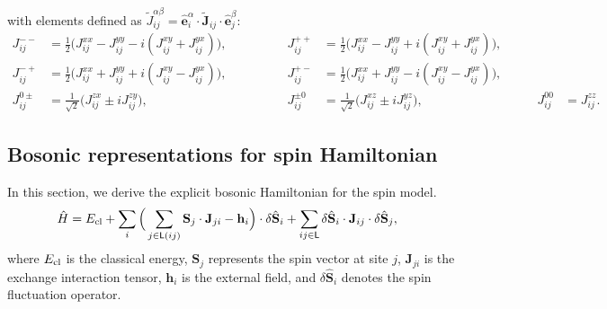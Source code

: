 with elements defined as $\widetilde{J}_{ij}^{\alpha\beta} = \hat{\mathbf{e}}_i^{\alpha} \cdot \widetilde{\mathbf{J}}_{ij} \cdot \hat{\mathbf{e}}_j^{\beta}$:
\begin{equation}\label{eq: expressions for exchange couplings}
    \begin{array}{rlrlrl}
        J_{ij}^{--} &= \frac{1}{2} \big( J_{ij}^{xx} - J_{ij}^{yy} - i (J_{ij}^{xy} + J_{ij}^{yx}) \big), \qquad \qquad &
        J_{ij}^{++} &= \frac{1}{2} \big( J_{ij}^{xx} - J_{ij}^{yy} + i (J_{ij}^{xy} + J_{ij}^{yx}) \big), &&\\[0.25em]
        J_{ij}^{-+} &= \frac{1}{2} \big( J_{ij}^{xx} + J_{ij}^{yy} + i (J_{ij}^{xy} - J_{ij}^{yx}) \big), \qquad &
        J_{ij}^{+-} &= \frac{1}{2} \big( J_{ij}^{xx} + J_{ij}^{yy} - i (J_{ij}^{xy} - J_{ij}^{yx}) \big), &&\\[0.25em]
        J_{ij}^{0\pm} &= \frac{1}{\sqrt{2}} \big( J_{ij}^{zx} \pm i J_{ij}^{zy} \big), &
        J_{ij}^{\pm0} &= \frac{1}{\sqrt{2}} \big( J_{ij}^{xz} \pm i J_{ij}^{yz} \big), & \qquad
        J_{ij}^{00} &= J_{ij}^{zz}.
    \end{array}
\end{equation}





\subsection{Bosonic representations for spin Hamiltonian}\label{subsec: Bosonic representations for spin exchange Hamiltonian}

In this section, we derive the explicit bosonic Hamiltonian for the spin model.
\begin{equation}
    \begin{split}
        \hat{H} 
        &= E_{\rm cl}
        + \sum_{i} \Big( \sum_{j \in \mathsf{L}(ij)} \mathbf{S}_{j} \cdot \mathbf{J}_{ji} - \mathbf{h}_{i} \Big) \cdot \delta \hat{\mathbf{S}}_{i}
        + \sum_{ij \in \mathsf{L}} \delta \hat{\mathbf{S}}_{i} \cdot \mathbf{J}_{ij} \cdot \delta \hat{\mathbf{S}}_{j},
    \end{split}
\end{equation}
where $E_{\rm cl}$ is the classical energy, $\mathbf{S}_{j}$ represents the spin vector at site $j$, $\mathbf{J}_{ji}$ is the exchange interaction tensor, $\mathbf{h}_{i}$ is the external field, and $\delta \hat{\mathbf{S}}_{i}$ denotes the spin fluctuation operator.

